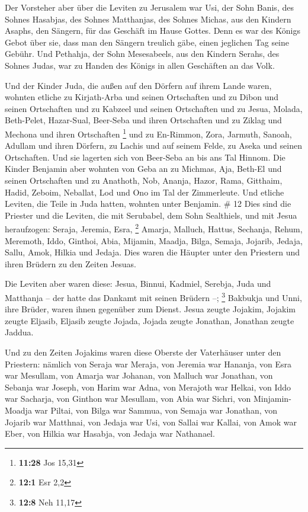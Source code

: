 Der Vorsteher aber über die Leviten zu Jerusalem war
Usi, der Sohn Banis, des Sohnes Hasabjas, des Sohnes Matthanjas, des
Sohnes Michas, aus den Kindern Asaphs, den Sängern, für das Geschäft im
Hause Gottes.  Denn es war des Königs Gebot über sie,
dass man den Sängern treulich gäbe, einen jeglichen Tag seine Gebühr.
 Und Pethahja, der Sohn Mesesabeels, aus den Kindern
Serahs, des Sohnes Judas, war zu Handen des Königs in allen Geschäften
an das Volk.

 Und der Kinder Juda, die außen auf den Dörfern auf ihrem
Lande waren, wohnten etliche zu Kirjath-Arba und seinen Ortschaften und
zu Dibon und seinen Ortschaften und zu Kabzeel und seinen Ortschaften
 und zu Jesua, Molada, Beth-Pelet, 
Hazar-Sual, Beer-Seba und ihren Ortschaften  und zu
Ziklag und Mechona und ihren Ortschaften \footnote{\textbf{11:28} Jos
  15,31}  und zu En-Rimmon, Zora, Jarmuth,
 Sanoah, Adullam und ihren Dörfern, zu Lachis und auf
seinem Felde, zu Aseka und seinen Ortschaften. Und sie lagerten sich von
Beer-Seba an bis ans Tal Hinnom.  Die Kinder Benjamin
aber wohnten von Geba an zu Michmas, Aja, Beth-El und seinen Ortschaften
 und zu Anathoth, Nob, Ananja,  Hazor,
Rama, Gitthaim,  Hadid, Zeboim, Neballat, 
Lod und Ono im Tal der Zimmerleute.  Und etliche Leviten,
die Teile in Juda hatten, wohnten unter Benjamin. \# 12 
Dies sind die Priester und die Leviten, die mit Serubabel, dem Sohn
Sealthiels, und mit Jesua heraufzogen: Seraja, Jeremia, Esra,
\footnote{\textbf{12:1} Esr 2,2}  Amarja, Malluch, Hattus,
 Sechanja, Rehum, Meremoth,  Iddo, Ginthoi,
Abia,  Mijamin, Maadja, Bilga,  Semaja,
Jojarib, Jedaja,  Sallu, Amok, Hilkia und Jedaja. Dies
waren die Häupter unter den Priestern und ihren Brüdern zu den Zeiten
Jesuas.

 Die Leviten aber waren diese: Jesua, Binnui, Kadmiel,
Serebja, Juda und Matthanja -- der hatte das Dankamt mit seinen Brüdern
--; \footnote{\textbf{12:8} Neh 11,17}  Bakbukja und Unni,
ihre Brüder, waren ihnen gegenüber zum Dienst.  Jesua
zeugte Jojakim, Jojakim zeugte Eljasib, Eljasib zeugte Jojada,
 Jojada zeugte Jonathan, Jonathan zeugte Jaddua.

 Und zu den Zeiten Jojakims waren diese Oberste der
Vaterhäuser unter den Priestern: nämlich von Seraja war Meraja, von
Jeremia war Hananja,  von Esra war Mesullam, von Amarja
war Johanan,  von Malluch war Jonathan, von Sebanja war
Joseph,  von Harim war Adna, von Merajoth war Helkai,
 von Iddo war Sacharja, von Ginthon war Mesullam,
 von Abia war Sichri, von Minjamin-Moadja war Piltai,
 von Bilga war Sammua, von Semaja war Jonathan,
 von Jojarib war Matthnai, von Jedaja war Usi,
 von Sallai war Kallai, von Amok war Eber,
 von Hilkia war Hasabja, von Jedaja war Nathanael.

